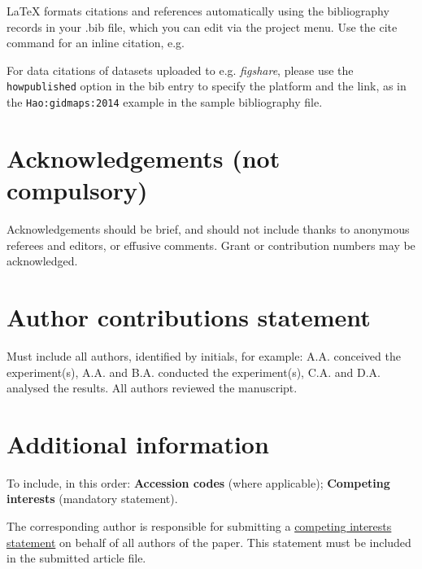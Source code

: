\documentclass[fleqn,10pt,  reprint, amsmath,amssymb,aps, floatfix]{wlscirep}
\begin{document}
\label{paper1}

\noindent LaTeX formats citations and references automatically using the bibliography records in your .bib file, which you can edit via the project menu. Use the cite command for an inline citation, e.g.  

For data citations of datasets uploaded to e.g. \emph{figshare}, please use the \verb|howpublished| option in the bib entry to specify the platform and the link, as in the \verb|Hao:gidmaps:2014| example in the sample bibliography file.

\section*{Acknowledgements (not compulsory)}

Acknowledgements should be brief, and should not include thanks to anonymous referees and editors, or effusive comments. Grant or contribution numbers may be acknowledged.

\section*{Author contributions statement}

Must include all authors, identified by initials, for example:
A.A. conceived the experiment(s),  A.A. and B.A. conducted the experiment(s), C.A. and D.A. analysed the results.  All authors reviewed the manuscript. 

\section*{Additional information}

To include, in this order: \textbf{Accession codes} (where applicable); \textbf{Competing interests} (mandatory statement). 

The corresponding author is responsible for submitting a \href{http://www.nature.com/srep/policies/index.html#competing}{competing interests statement} on behalf of all authors of the paper. This statement must be included in the submitted article file.
\end{document}
